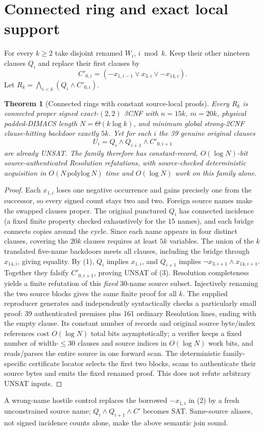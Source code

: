 \documentclass[11pt]{article}
\newtheorem{theorem}{Theorem}
\begin{document}
\section{Connected ring and exact local support}
For every $k\ge2$ take disjoint renamed $W_i$, $i\bmod k$.
Keep their other nineteen clauses $Q_i$ and replace their first clauses by
\[
 C'_{0,i}=(-x_{1,i-1}\lor x_{3,i}\lor -x_{14,i}). \tag{2}
\]
Let $R_k=\bigwedge_{i<k}(Q_i\land C'_{0,i})$.
\begin{theorem}[Connected rings with constant source-local proofs]
Every $R_k$ is connected proper signed exact-$(2,2)$ 3CNF
with $n=15k$, $m=20k$, physical padded-DIMACS length
$N=\Theta(k\log k)$, and minimum global strong-2CNF
clause-hitting backdoor exactly $5k$. Yet for each $i$ the
39 genuine original clauses
\[
 U_i=Q_i\land Q_{i+1}\land C'_{0,i+1} \tag{3}
\]
are already UNSAT. The family therefore has constant-record,
$O(\log N)$-bit source-authenticated Resolution refutations,
with source-checked deterministic acquisition in $O(N\,\mathrm{polylog}\,N)$
time and $O(\log N)$ work on this family alone.
\end{theorem}
\begin{proof}
Each $x_{1,i}$ loses one negative occurrence and gains precisely one
from the successor, so every signed count stays two and two.
Foreign source names make the swapped clauses proper.
The original punctured $Q_i$ has connected incidence (a fixed finite
property checked exhaustively for the $15$ names), and each bridge
connects copies around the cycle.
Since each name appears in four distinct clauses, covering the $20k$
clauses requires at least $5k$ variables. The union of the $k$
translated five-name backdoors meets all clauses, including the
bridge through $x_{14,i}$, giving equality.
By (1), $Q_i$ implies $x_{1,i}$, and $Q_{i+1}$ implies
$\neg x_{3,i+1}\land x_{14,i+1}$.
Together they falsify $C'_{0,i+1}$, proving UNSAT of (3).
Resolution completeness yields a finite refutation of this
\emph{fixed} $30$-name source subset. Injectively renaming
the two source blocks gives the same finite proof for all $k$.
The supplied reproducer generates and independently syntactically
checks a particularly small proof: 39 authenticated premises plus
161 ordinary Resolution lines, ending with the empty clause.
Its constant number of records and original source byte/index references
cost $O(\log N)$ total bits asymptotically; a verifier keeps a fixed
number of width-$\le30$ clauses and source indices in $O(\log N)$
work bits, and reads/parses the entire source in one forward scan.
The deterministic family-specific certificate locator selects the first
two blocks, scans to authenticate their source bytes and emits the
fixed renamed proof. This does not refute arbitrary UNSAT inputs.
\end{proof}
A wrong-name hostile control replaces the borrowed $-x_{1,i}$ in (2)
by a fresh unconstrained source name; $Q_i\land Q_{i+1}\land C'$ becomes
SAT. Same-source aliases, not signed incidence counts alone,
make the above semantic join sound.
\end{document}
